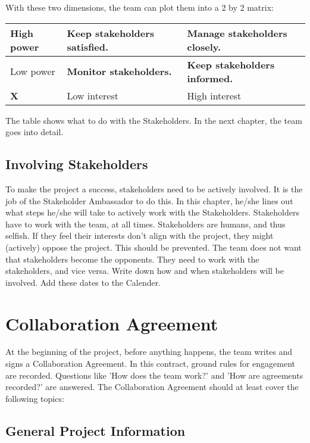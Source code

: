 \documentclass[10pt]{report}
\begin{document}
With these two dimensions, the team can plot them into a 2 by 2 matrix:

\medskip
\begin{tabularx}{1\textwidth} { 
  | >{\raggedright\arraybackslash}l
  || >{\raggedright\arraybackslash}l
  | >{\raggedright\arraybackslash}X | }
 \hline
 High power & \textbf{Keep stakeholders satisfied.} & \textbf{Manage stakeholders closely.} \\
 \hline
 Low power & \textbf{Monitor stakeholders.} & \textbf{Keep stakeholders informed.} \\
 \hline
 \hline
 \textbf{X} & Low interest & High interest \\
 \hline
\end{tabularx}
\medskip

The table shows what to do with the Stakeholders. In the next chapter, the team goes into detail.

\subsection{Involving Stakeholders}

To make the project a success, stakeholders need to be actively involved. It is the job of the Stakeholder Ambassador to do this. In this chapter, he/she lines out what steps he/she will take to actively work with the Stakeholders. Stakeholders have to work with the team, at all times. Stakeholders are humans, and thus selfish. If they feel their interests don't align with the project, they might (actively) oppose the project. This should be prevented. The team does not want that stakeholders become the opponents. They need to work with the stakeholders, and vice versa. Write down how and when stakeholders will be involved. Add these dates to the Calender.

\newpage

\section{Collaboration Agreement}

At the beginning of the project, before anything happens, the team writes and signs a Collaboration Agreement. In this contract, ground rules for engagement are recorded. Questions like 'How does the team work?' and 'How are agreements recorded?' are answered. The Collaboration Agreement should at least cover the following topics:

\subsection{General Project Information}
\end{document}
